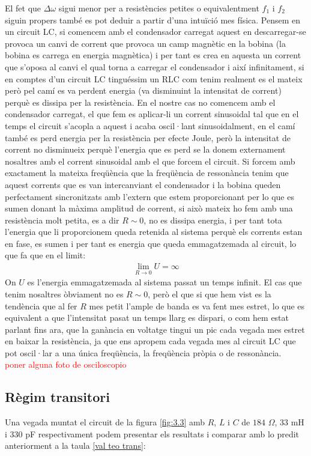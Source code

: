 \documentclass[a4paper,10.5pt]{report}
\begin{document}
El fet que $\Delta\omega$ sigui menor per a resistències petites o equivalentment $f_1$ i $f_2$ siguin propers també es pot deduir a partir d'una intuïció mes física. Pensem en un circuit LC, si comencem amb el condensador carregat aquest en descarregar-se provoca un canvi de corrent que provoca un camp magnètic en la bobina (la bobina es carrega en energia magnètica) i per tant es crea en aquesta un corrent que s'oposa al canvi el qual torna a carregar el condensador i així infinitament, si en comptes d'un circuit LC tinguéssim  un RLC com tenim realment es el mateix però pel camí es va perdent energia (va disminuint la intensitat de corrent) perquè es dissipa per la resistència. En el nostre cas no comencem amb el condensador carregat, el que fem es aplicar-li un corrent sinusoidal tal que en el temps el circuit s'acopla a aquest i acaba oscil·lant sinusoidalment, en el camí també es perd energia per la resistència per efecte Joule, però la intensitat de corrent no disminueix perquè l'energia que es perd se la donem externament nosaltres amb el corrent sinusoidal amb el que forcem el circuit. Si forcem amb exactament la mateixa freqüència que la freqüència de ressonància tenim que aquest corrents que es van intercanviant el condensador i la bobina queden perfectament sincronitzats amb l'extern que estem proporcionant per lo que es sumen donant la màxima amplitud de corrent, si això mateix ho fem amb una resistència molt petita, es a dir $R \sim 0$, no es dissipa energia, i per tant tota l'energia que li proporcionem queda retenida al sistema perquè els corrents estan en fase, es sumen i per tant es energia que queda emmagatzemada al circuit, lo que fa que en el limit:
\begin{eqnarray}
	\lim_{R \to 0} U = \infty
\end{eqnarray}
On $U$ es l'energia emmagatzemada al sistema passat un temps infinit. El cas que tenim nosaltres òbviament no es $R \sim 0$, però el que si que hem vist es la tendència que al fer $R$ mes petit l'ample de banda es va fent mes estret, lo que es equivalent a que l'intensitat pasat un temps llarg es dispari, o com hem estat parlant fins ara, que la ganància en voltatge tingui un pic cada vegada mes estret en baixar la resistència, ja que ens apropem cada vegada mes al circuit LC que pot oscil·lar a una única freqüència, la freqüència pròpia o de ressonància.\\
\textcolor{red}{poner alguna foto de osciloscopio}

\subsection{Règim transitori}
Una vegada muntat el circuit de la figura \ref{fig:3.3} amb $R$, $L$ i $C$ de $184$ $\Omega$, $33$ mH i $330$ pF respectivament podem presentar els resultats i comparar amb lo predit anteriorment a la taula \ref{val teo trans}:
\end{document}
